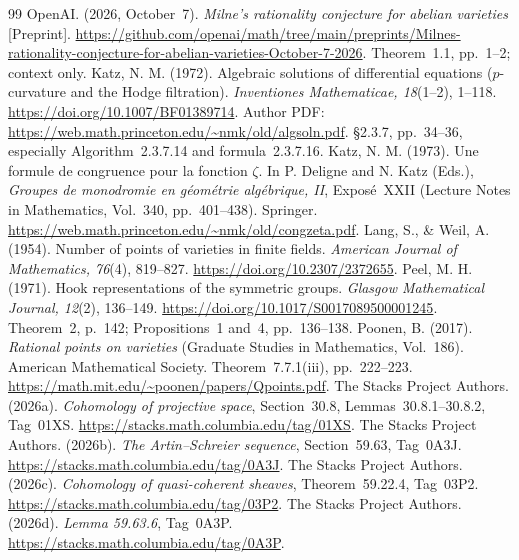 \documentclass[11pt]{article}
\begin{document}
\begin{thebibliography}{99}
OpenAI. (2026, October~7). \emph{Milne's rationality conjecture for abelian varieties} [Preprint]. \url{https://github.com/openai/math/tree/main/preprints/Milnes-rationality-conjecture-for-abelian-varieties-October-7-2026}. Theorem~1.1, pp.~1--2; context only.
Katz, N. M. (1972). Algebraic solutions of differential equations ($p$-curvature and the Hodge filtration). \emph{Inventiones Mathematicae, 18}(1--2), 1--118. \url{https://doi.org/10.1007/BF01389714}. Author PDF: \url{https://web.math.princeton.edu/~nmk/old/algsoln.pdf}. \S2.3.7, pp.~34--36, especially Algorithm~2.3.7.14 and formula~2.3.7.16.
Katz, N. M. (1973). Une formule de congruence pour la fonction $\zeta$. In P. Deligne and N. Katz (Eds.), \emph{Groupes de monodromie en g\'eom\'etrie alg\'ebrique, II}, Expos\'e~XXII (Lecture Notes in Mathematics, Vol.~340, pp.~401--438). Springer. \url{https://web.math.princeton.edu/~nmk/old/congzeta.pdf}.
Lang, S., \& Weil, A. (1954). Number of points of varieties in finite fields. \emph{American Journal of Mathematics, 76}(4), 819--827. \url{https://doi.org/10.2307/2372655}.
Peel, M. H. (1971). Hook representations of the symmetric groups. \emph{Glasgow Mathematical Journal, 12}(2), 136--149. \url{https://doi.org/10.1017/S0017089500001245}. Theorem~2, p.~142; Propositions~1 and~4, pp.~136--138.
Poonen, B. (2017). \emph{Rational points on varieties} (Graduate Studies in Mathematics, Vol.~186). American Mathematical Society. Theorem~7.7.1(iii), pp.~222--223. \url{https://math.mit.edu/~poonen/papers/Qpoints.pdf}.
The Stacks Project Authors. (2026a). \emph{Cohomology of projective space}, Section~30.8, Lemmas~30.8.1--30.8.2, Tag~01XS. \url{https://stacks.math.columbia.edu/tag/01XS}.
The Stacks Project Authors. (2026b). \emph{The Artin--Schreier sequence}, Section~59.63, Tag~0A3J. \url{https://stacks.math.columbia.edu/tag/0A3J}.
The Stacks Project Authors. (2026c). \emph{Cohomology of quasi-coherent sheaves}, Theorem~59.22.4, Tag~03P2. \url{https://stacks.math.columbia.edu/tag/03P2}.
The Stacks Project Authors. (2026d). \emph{Lemma 59.63.6}, Tag~0A3P. \url{https://stacks.math.columbia.edu/tag/0A3P}.

\end{thebibliography}
\end{document}
